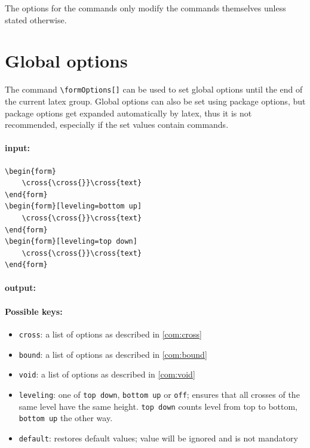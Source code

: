 \documentclass[parskip=half-]{scrartcl}
\begin{document}
The options for the commands only modify the commands themselves unless stated otherwise.

\section{Global options}

The command \verb|\formOptions[]| can be used to set global options until the end of the current latex group. Global options can also be set using package options, but package options get expanded automatically by latex, thus it is not recommended, especially if the set values contain commands.

\paragraph{input:}
\begin{verbatim}
\begin{form}
    \cross{\cross{}}\cross{text}
\end{form}
\begin{form}[leveling=bottom up]
    \cross{\cross{}}\cross{text}
\end{form}
\begin{form}[leveling=top down]
    \cross{\cross{}}\cross{text}
\end{form}
\end{verbatim}

\paragraph{output:}
\begin{center}
    \begin{form}
        \cross{\cross{}}
    \end{form}
    \begin{form}[leveling=bottom up]
        \cross{\cross{}}
    \end{form}
    \begin{form}[leveling=top down]
        \cross{\cross{}}
    \end{form}
\end{center}

\paragraph{Possible keys:}
\begin{itemize}
    \item \verb|cross|: a list of options as described in \cref{com:cross}
    \item \verb|bound|: a list of options as described in \cref{com:bound}
    \item \verb|void|: a list of options as described in \cref{com:void}
    \item \verb|leveling|: one of \verb|top down|, \verb|bottom up| or \verb|off|; ensures that all crosses of the same level have the same height. \verb|top down| counts level from top to bottom, \verb|bottom up| the other way.
    \item \verb|default|: restores default values; value will be ignored and is not mandatory
\end{itemize}
\end{document}
